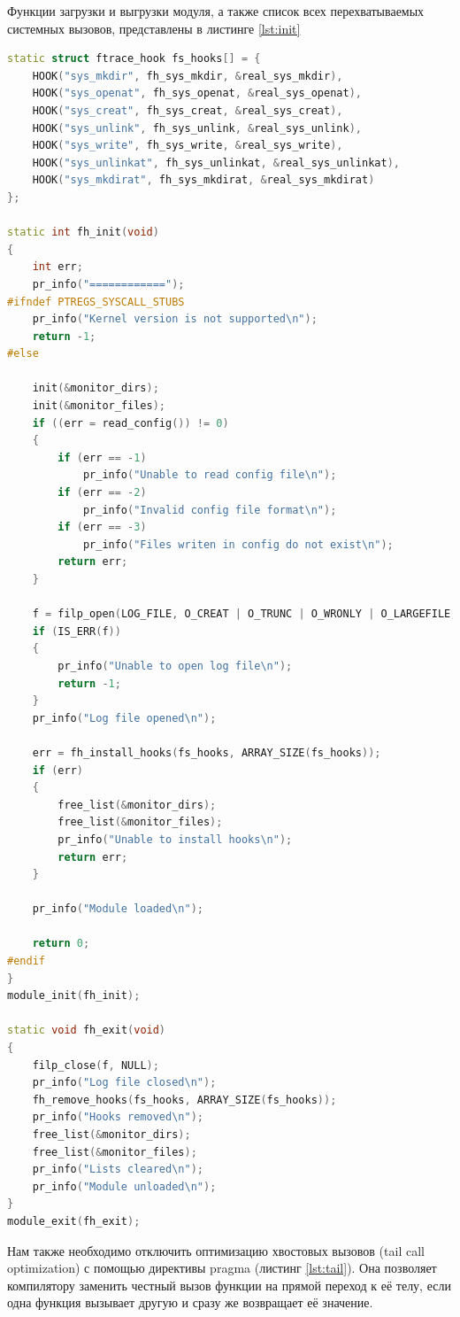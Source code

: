 \documentclass[a4paper,14pt]{article}
\begin{document}
Функции загрузки и выгрузки модуля, а также список всех перехватываемых системных вызовов, представлены в листинге \ref{lst:init}

\begin{lstlisting}[language=C++,label={lst:init}, caption=\text{Загрузка и выгрузка модуля.}]
static struct ftrace_hook fs_hooks[] = {
	HOOK("sys_mkdir", fh_sys_mkdir, &real_sys_mkdir),
	HOOK("sys_openat", fh_sys_openat, &real_sys_openat),
	HOOK("sys_creat", fh_sys_creat, &real_sys_creat),
	HOOK("sys_unlink", fh_sys_unlink, &real_sys_unlink),
	HOOK("sys_write", fh_sys_write, &real_sys_write),
	HOOK("sys_unlinkat", fh_sys_unlinkat, &real_sys_unlinkat),
	HOOK("sys_mkdirat", fh_sys_mkdirat, &real_sys_mkdirat)
};

static int fh_init(void)
{
	int err;
	pr_info("============");
#ifndef PTREGS_SYSCALL_STUBS
	pr_info("Kernel version is not supported\n");
	return -1;
#else

	init(&monitor_dirs);
	init(&monitor_files);
	if ((err = read_config()) != 0)
	{
		if (err == -1)
			pr_info("Unable to read config file\n");
		if (err == -2)
			pr_info("Invalid config file format\n");
		if (err == -3)
			pr_info("Files writen in config do not exist\n");
		return err;
	}

	f = filp_open(LOG_FILE, O_CREAT | O_TRUNC | O_WRONLY | O_LARGEFILE, 0);
	if (IS_ERR(f))
	{
		pr_info("Unable to open log file\n");
		return -1;
	}
	pr_info("Log file opened\n");

	err = fh_install_hooks(fs_hooks, ARRAY_SIZE(fs_hooks));
	if (err)
	{
		free_list(&monitor_dirs);
		free_list(&monitor_files);
	    pr_info("Unable to install hooks\n");
		return err;
	}

	pr_info("Module loaded\n");

	return 0;
#endif
}
module_init(fh_init);

static void fh_exit(void)
{
	filp_close(f, NULL);
	pr_info("Log file closed\n");
	fh_remove_hooks(fs_hooks, ARRAY_SIZE(fs_hooks));
	pr_info("Hooks removed\n");
	free_list(&monitor_dirs);
	free_list(&monitor_files);
	pr_info("Lists cleared\n");
	pr_info("Module unloaded\n");
}
module_exit(fh_exit);
\end{lstlisting}

Нам также необходимо отключить оптимизацию хвостовых вызовов (tail call optimization) с помощью директивы pragma (листинг \ref{lst:tail}). Она позволяет компилятору заменить честный вызов функции на прямой переход к её телу, если одна функция вызывает другую и сразу же возвращает её значение. 
\end{document}
